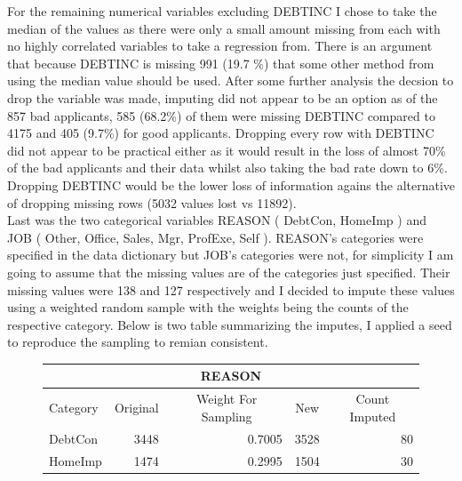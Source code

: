 For the remaining numerical variables excluding DEBTINC I chose to take the median of the values as there were only a small amount missing from each with no highly correlated variables to take a regression from. There is an argument that because DEBTINC is missing 991 (19.7 \%) that some other method from using the median value should be used. After some further analysis the decsion to drop the variable was made, imputing did not appear to be an option as of the 857 bad applicants, 585 (68.2\%) of them were missing DEBTINC compared to 4175 and 405 (9.7\%) for good applicants. Dropping every row with DEBTINC did not appear to be practical either as it would result in the loss of almost 70\% of the bad applicants and their data whilst also taking the bad rate down to 6\%. Dropping DEBTINC would be the lower loss of information agains the alternative of dropping missing rows (5032 values lost vs 11892). \\

Last was the two categorical variables REASON ( DebtCon, HomeImp ) and JOB ( Other, Office, Sales, Mgr, ProfExe, Self ). REASON's categories were specified in the data dictionary but JOB's categories were not, for simplicity I am going to assume that the missing values are of the categories just specified. Their missing values were 138 and 127 respectively and I decided to impute these values using a weighted random sample with the weights being the counts of the respective category. Below is two table summarizing the imputes, I applied a seed to reproduce the sampling to remian consistent.

\begin{figure}[ht]\label{REASON_IMPUTES}
	\centering
	\renewcommand{\arraystretch}{1.25}
	\begin{tabular}{lrrrr}
	\multicolumn{5}{c}{REASON}\\
	\hline
	Category & \multicolumn{1}{c}{Original} & \multicolumn{1}{c}{Weight For Sampling} & \multicolumn{1}{c}{New} & \multicolumn{1}{c}{Count Imputed} \\ 
	\hline
	DebtCon & 3448 & 0.7005 & 3528 & 80\\
	HomeImp & 1474 & 0.2995 & 1504  & 30\\
	\end{tabular}
\end{figure}


